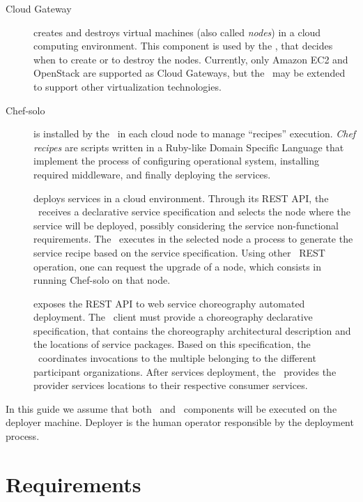 \begin{description}

\item [Cloud Gateway] creates and destroys virtual machines (also called \emph{nodes}) in a cloud computing environment. This component is used by the \dm, that decides when to create or to destroy the nodes. Currently, only Amazon EC2 and OpenStack are supported as Cloud Gateways, but the \dm\ may be extended to support other virtualization technologies.

\item[Chef-solo] is installed by the \ee\ in each cloud node to manage ``recipes'' execution. \emph{Chef recipes} are scripts written in a Ruby-like Domain Specific Language that implement the process of configuring operational system, installing required middleware, and finally deploying the services.

\item [\dm] deploys services in a cloud environment. Through its REST API, the \dm\ receives a declarative service specification and selects the node where the service will be deployed, possibly considering the service non-functional requirements. The \dm\ executes in the selected node a process to generate the service recipe based on the service specification. Using other \dm\ REST operation, one can request the upgrade of a node, which consists in running Chef-solo on that node.

\item [\cd] exposes the REST API to web service choreography automated deployment. The \cd\ client must provide a choreography declarative specification, that contains the choreography architectural description and the locations of service packages. Based on this specification, the \cd\ coordinates invocations to the multiple  belonging to the different participant organizations. After services deployment, the \cd\ provides the provider services locations to their respective consumer services.

\end{description} 

In this guide we assume that both \cd\ and \dm\ components will be executed on the deployer machine. Deployer is the human operator responsible by the deployment process. 

\section{Requirements}

